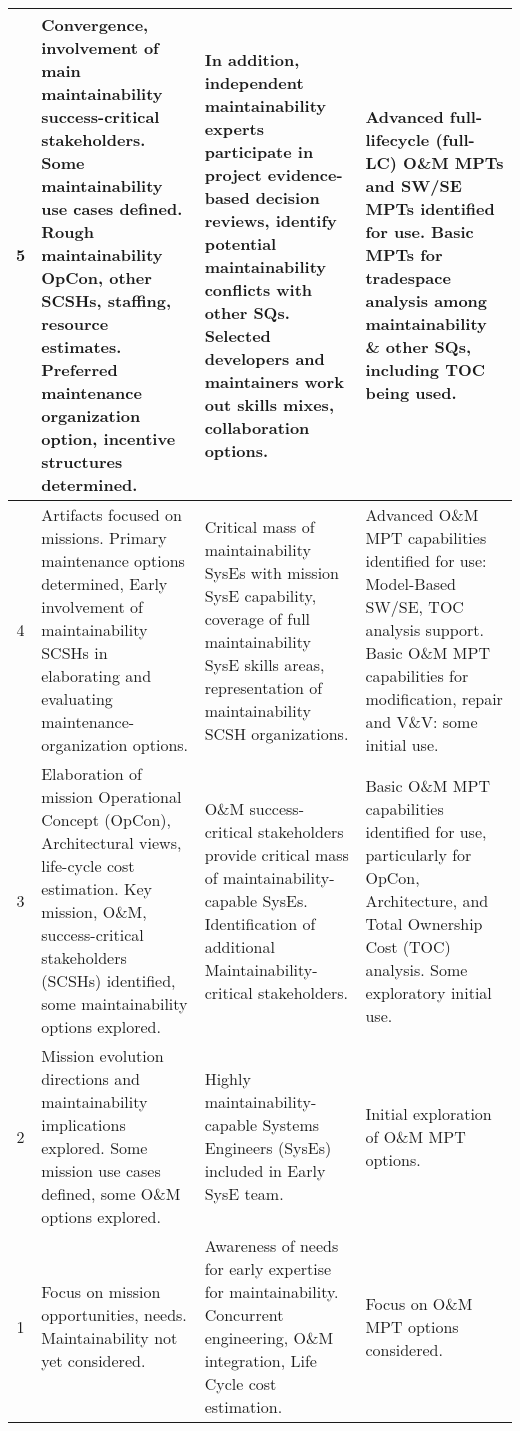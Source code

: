 \begin{table*}[htbp]
{\begin{tabular}{|c|p{18em}|p{18em}|p{16.5em}|}
			\midrule
			5     & Convergence, involvement of main maintainability success-critical stakeholders. Some maintainability use cases defined. Rough maintainability OpCon, other SCSHs, staffing, resource estimates. Preferred maintenance organization option, incentive structures determined. & In addition, independent maintainability experts participate in project evidence-based decision reviews, identify potential maintainability conflicts with other SQs. Selected developers and maintainers work out skills mixes, collaboration options. & Advanced full-lifecycle (full-LC) O\&M MPTs and SW/SE MPTs identified for use. Basic MPTs for tradespace analysis among maintainability \& other SQs, including TOC being used. \\
			\midrule
			4     & Artifacts focused on missions. Primary maintenance options determined, Early involvement of maintainability SCSHs in elaborating and evaluating maintenance-organization options. & Critical mass of maintainability SysEs with mission SysE capability, coverage of full maintainability SysE skills areas, representation of maintainability SCSH organizations. & Advanced O\&M MPT capabilities identified for use: Model-Based SW/SE, TOC analysis support. Basic O\&M MPT capabilities for modification, repair and V\&V: some initial use. \\
			\midrule
			3     & Elaboration of mission Operational Concept (OpCon), Architectural views, life-cycle cost estimation. Key mission, O\&M, success-critical stakeholders (SCSHs) identified, some maintainability options explored. & O\&M success-critical stakeholders provide critical mass of maintainability-capable SysEs. Identification of additional Maintainability-critical stakeholders. & Basic O\&M MPT capabilities identified for use, particularly for OpCon, Architecture, and Total Ownership Cost (TOC) analysis. Some exploratory initial use. \\
			\midrule
			2     & Mission evolution directions and maintainability implications explored. Some mission use cases defined, some O\&M options explored. & Highly maintainability-capable Systems Engineers (SysEs) included in Early SysE team. & Initial exploration of O\&M MPT options. \\
			\midrule
			1     & Focus on mission opportunities, needs. Maintainability not yet considered. & Awareness of needs for early expertise for maintainability. Concurrent engineering, O\&M integration, Life Cycle cost estimation. & Focus on O\&M MPT options considered. \\
			\bottomrule
		\end{tabular}%
	}
	\label{tab:smrf}%
\end{table*}%


